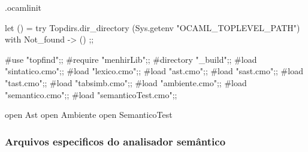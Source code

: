 \documentclass[12pt,a4paper,twoside]{article}
\begin{document}
.ocamlinit
\begin{terminal}
let () =
  try Topdirs.dir_directory (Sys.getenv "OCAML_TOPLEVEL_PATH")
  with Not_found -> ()
;;

#use "topfind";;
#require "menhirLib";;
#directory "_build";;
#load "sintatico.cmo";;
#load "lexico.cmo";;
#load "ast.cmo";;
#load "sast.cmo";;
#load "tast.cmo";;
#load "tabsimb.cmo";;
#load "ambiente.cmo";;
#load "semantico.cmo";;
#load "semanticoTest.cmo";;

open Ast
open Ambiente
open SemanticoTest
\end{terminal}

\subsubsection{Arquivos especificos do analisador semântico}
\end{document}
